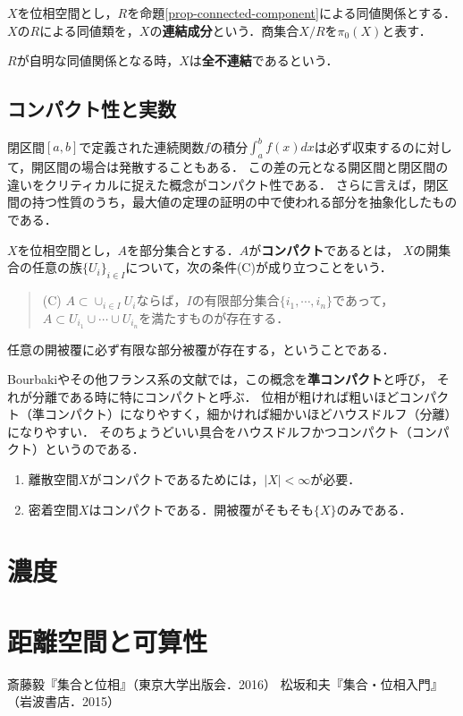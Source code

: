\documentclass[uplatex, 12pt, dvipdfmx]{jsreport}
\begin{document}
\begin{definition}
    $X$を位相空間とし，$R$を命題\ref{prop-connected-component}による同値関係とする．
    $X$の$R$による同値類を，$X$の\textbf{連結成分}という．商集合$X/R$を$\pi_0(X)$と表す．

    $R$が自明な同値関係となる時，$X$は\textbf{全不連結}であるという．
\end{definition}

\section{コンパクト性と実数}

\begin{screen}
    閉区間$[a,b]$で定義された連続関数$f$の積分$\int^b_af(x)dx$は必ず収束するのに対して，開区間の場合は発散することもある．
    この差の元となる開区間と閉区間の違いをクリティカルに捉えた概念がコンパクト性である．
    さらに言えば，閉区間の持つ性質のうち，最大値の定理の証明の中で使われる部分を抽象化したものである．
\end{screen}

\begin{definition}[compact]
    $X$を位相空間とし，$A$を部分集合とする．$A$が\textbf{コンパクト}であるとは，
    $X$の開集合の任意の族$\{U_i\}_{i\in I}$について，次の条件(C)が成り立つことをいう．
    \begin{quote}
        (C) $A\subset\cup_{i\in I}U_i$ならば，$I$の有限部分集合$\{i_1,\cdots,i_n\}$であって，$A\subset U_{i_1}\cup\cdots\cup U_{i_n}$を満たすものが存在する．
    \end{quote}
    任意の開被覆に必ず有限な部分被覆が存在する，ということである．
\end{definition}
\begin{remark}[quasicompact]
    Bourbakiやその他フランス系の文献では，この概念を\textbf{準コンパクト}と呼び，
    それが分離である時に特にコンパクトと呼ぶ．
    位相が粗ければ粗いほどコンパクト（準コンパクト）になりやすく，細かければ細かいほどハウスドルフ（分離）になりやすい．
    そのちょうどいい具合をハウスドルフかつコンパクト（コンパクト）というのである．
\end{remark}

\begin{example}\mbox{}
    \begin{enumerate}
        \item 離散空間$X$がコンパクトであるためには，$|X|<\infty$が必要．
        \item 密着空間$X$はコンパクトである．開被覆がそもそも$\{X\}$のみである．
    \end{enumerate}
\end{example}

\chapter{濃度}

\chapter{距離空間と可算性}

\begin{thebibliography}{9}
        斎藤毅『集合と位相』（東京大学出版会．2016）
        松坂和夫『集合・位相入門』（岩波書店．2015）
\end{thebibliography}
\end{document}
